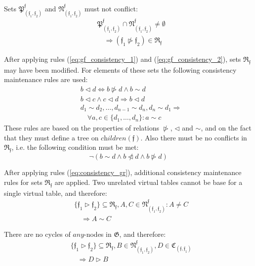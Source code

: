 \documentclass[times, 10pt,twocolumn]{article}
\newcommand{\gC}{\mathfrak{C}}
\newcommand{\gG}{\mathfrak{G}}
\newcommand{\gR}{\mathfrak{R}}
\newcommand{\gN}{\mathfrak{N}}
\newcommand{\gP}{\mathfrak{P}}
\newcommand{\gf}{\mathfrak{f}}
\newcommand{\any}{\textit{any}}
\newcommand{\children}{\textit{children}}
\newcommand{\nlhd}{\ntriangleleft}
\newcommand{\nrhd}{\ntriangleright}
\begin{document}
Sets $\gP^{\gf}_{(\gf_1, \gf_2)}$ and $\gN^{\gf}_{(\gf_1, \gf_2)}$ must not conflict:
\begin{equation}\label{eq:gf_consistency_2}
\begin{aligned}
&\gP^{\gf}_{(\gf_1, \gf_2)} \cap \gN^{\gf}_{(\gf_1, \gf_2)} \ne \emptyset \\
&\quad \Longrightarrow (\gf_1 \nrhd \gf_2) \in \gR_{\gf}
\end{aligned}
\end{equation}

After applying rules (\ref{eq:gf_consistency_1})
and (\ref{eq:gf_consistency_2}), sets $\gR_{\gf}$ may have been modified.
For elements of these sets the following consistency maintenance rules are used:
\begin{equation}\label{eq:consistency_gr}
\begin{aligned}
&b \lhd d \Longleftrightarrow b \nrhd d \wedge b \sim d \\
&b \lhd c \wedge c \lhd d \Longrightarrow b \lhd d \\
&d_1 \sim d_2, \ldots, d_{n - 1} \sim d_n, d_n \sim d_1 \Longrightarrow \\
&\quad \forall a, c \in \{d_1, \ldots, d_n\}: a \sim c
\end{aligned}
\end{equation}
These rules are based on the properties of relations $\nrhd$, $\lhd$
and $\sim$, and on the fact that they must define
a tree on $\children(\gf)$.
Also there must be no conflicts in $\gR_{\gf}$,
i.e. the following condition must be met:
\begin{equation}\label{eq:consistency_conflict_1}
\neg(b \sim d \wedge b \nlhd d \wedge b \nrhd d)
\end{equation}

After applying rules (\ref{eq:consistency_gr}),
additional consistency maintenance rules for sets $\gR_{\gf}$ are applied.
Two unrelated virtual tables cannot be base for a single virtual table,
and therefore:
\begin{equation}\label{eq:gca_consistency_1}
\begin{aligned}
&\{\gf_1 \rhd \gf_2\} \subseteq \gR_{\gf}, A, C \in \gN^{\gf}_{(\gf_1, \gf_2)}: A \ne C \\
&\quad \Longrightarrow A \sim C
\end{aligned}
\end{equation}

There are no cycles of $\any$-nodes in $\gG$, and therefore:
\begin{equation}\label{eq:gca_consistency_2}
\begin{aligned}
&\{\gf_1 \rhd \gf_2\} \subseteq \gR_{\gf}, B \in \gN^{\gf}_{(\gf_1, \gf_2)}, D \in \gC_{(\gf, \gf_1)} \\
&\quad \Longrightarrow D \rhd B
\end{aligned}
\end{equation}
\end{document}
